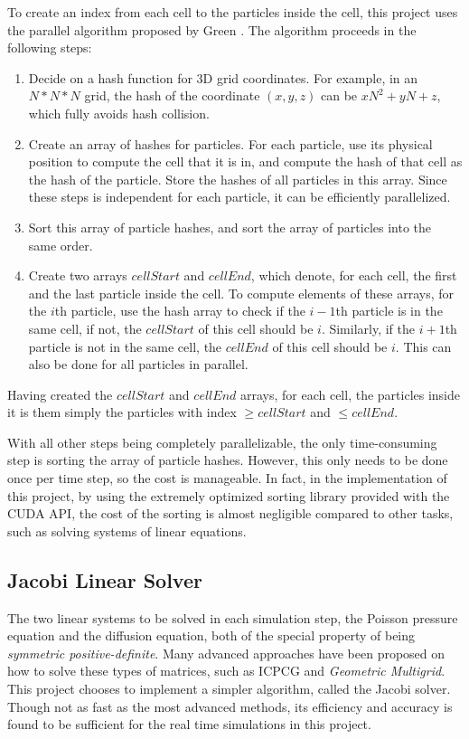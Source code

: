 To create an index from each cell to the particles inside the cell, this project uses the parallel algorithm proposed by Green \cite{harlow1965numerical}. The algorithm proceeds in the following steps:
\begin{enumerate}
    \item Decide on a hash function for 3D grid coordinates. For example, in an $N*N*N$ grid, the hash of the coordinate $(x,y,z)$ can be $xN^2+yN+z$, which fully avoids hash collision.
    
    \item Create an array of hashes for particles. For each particle, use its physical position to compute the cell that it is in, and compute the hash of that cell as the hash of the particle. Store the hashes of all particles in this array. Since these steps is independent for each particle, it can be efficiently parallelized.
    
    \item Sort this array of particle hashes, and sort the array of particles into the same order. 
    
    \item Create two arrays $cellStart$ and $cellEnd$, which denote, for each cell, the first and the last particle inside the cell. To compute elements of these arrays, for the $i$th particle, use the hash array to check if the $i-1$th particle is in the same cell, if not, the $cellStart$ of this cell should be $i$. Similarly, if the $i+1$th particle is not in the same cell, the $cellEnd$ of this cell should be $i$. This can also be done for all particles in parallel.
    
\end{enumerate}
Having created the $cellStart$ and $cellEnd$ arrays, for each cell, the particles inside it is them simply the particles with index $\geq cellStart$ and $\leq cellEnd$.

With all other steps being completely parallelizable, the only time-consuming step is sorting the array of particle hashes. However, this only needs to be done once per time step, so the cost is manageable. In fact, in the implementation of this project, by using the extremely optimized sorting library provided with the CUDA API, the cost of the sorting is almost negligible compared to other tasks, such as solving systems of linear equations.

\subsection{Jacobi Linear Solver}
The two linear systems to be solved in each simulation step, the Poisson pressure equation and the diffusion equation, both of the special property of being \textit{symmetric positive-definite}. Many advanced approaches have been proposed on how to solve these types of matrices, such as ICPCG \cite{bridson2015fluid} and \textit{Geometric Multigrid}\cite{chentanez2011real}. This project chooses to implement a simpler algorithm, called the Jacobi solver. Though not as fast as the most advanced methods, its efficiency and accuracy is found to be sufficient for the real time simulations in this project.

